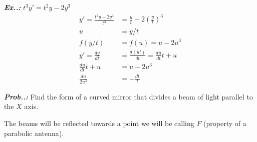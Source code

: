 \documentclass[a4paper]{article}
\begin{document}
\vspace{1ex}\vspace{1ex}

\vspace{2ex}\textit{\textbf{Ex.\thesection.\theex:}} $t^{3}y'=t^{2}y-2y^{3}$
\begin{align} 
y'=\frac{t^{2}y-2y^{3}}{t^{3}}&=\frac{y}{t}-2\left( \frac{y}{t} \right)^{3} \\
u&=y / t \\
f(y / t)&=f(u)=u-2u^{3} \\
y'=\frac{dy}{dt}&=\frac{d(ut)}{dt}=\frac{du}{dt}t+u \\
\frac{du}{dt}t+u&=u-2u^{3} \\
\frac{du}{2u^{3}}&=-\frac{dt}{t}
\end{align}

\vspace{2ex}\textit{\textbf{Prob.\thesection.\theprob:}} Find the form of a curved mirror that divides a beam of light parallel to the $X$ axis.

The beams will be reflected towards a point we will be calling $F$ (property of a parabolic antenna).
\end{document}
